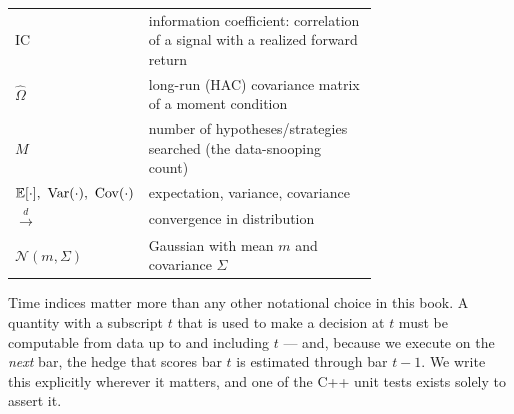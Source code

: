 \begin{center}
\begin{tabular}{lp{0.72\linewidth}}
$\mathrm{IC}$ & information coefficient: correlation of a signal with a realized forward return \\
$\hat\Omega$ & long-run (HAC) covariance matrix of a moment condition \\
$M$ & number of hypotheses/strategies searched (the data-snooping count) \\
$\E[\cdot],\ \Var(\cdot),\ \Cov(\cdot)$ & expectation, variance, covariance \\
$\xrightarrow{\ d\ }$ & convergence in distribution \\
$\mathcal{N}(m,\Sigma)$ & Gaussian with mean $m$ and covariance $\Sigma$ \\
\bottomrule
\end{tabular}
\end{center}

Time indices matter more than any other notational choice in this book. A quantity
with a subscript $t$ that is used to make a decision at $t$ must be computable from
data up to and including $t$ --- and, because we execute on the \emph{next} bar, the
hedge that scores bar $t$ is estimated through bar $t-1$. We write this explicitly
wherever it matters, and one of the C++ unit tests exists solely to assert it.
